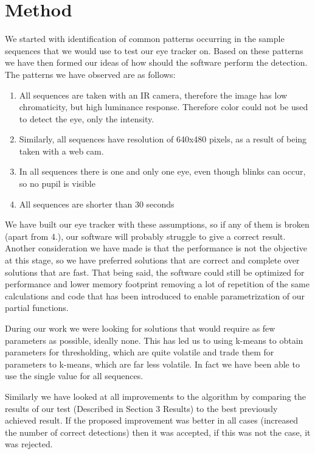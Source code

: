 \section{Method}

We started with identification of common patterns occurring in the sample sequences that we would use to test our eye tracker on. Based on these patterns we have then formed our ideas of how should the software perform the detection. The patterns we have observed are as follows:

\begin{enumerate}

\item All sequences are taken with an IR camera, therefore the image has low chromaticity, but high luminance response. Therefore color could not be used to detect the eye, only the intensity.
\item Similarly, all sequences have resolution of 640x480 pixels, as a result of being taken with a web cam.
\item In all sequences there is one and only one eye, even though blinks can occur, so no pupil is visible
\item All sequences are shorter than 30 seconds

\end{enumerate}

We have built our eye tracker with these assumptions, so if any of them is broken (apart from 4.), our software will probably struggle to give a correct result. Another consideration we have made is that the performance is not the objective at this stage, so we have preferred solutions that are correct and complete over solutions that are fast. That being said, the software could still be optimized for performance and lower memory footprint removing a lot of repetition of the same calculations and code that has been introduced to enable parametrization of our partial functions.

During our work we were looking for solutions that would require as few parameters as possible, ideally none. This has led us to using k-means to obtain parameters for thresholding, which are quite volatile and trade them for parameters to k-means, which are far less volatile. In fact we have been able to use the single value for all sequences.

Similarly we have looked at all improvements to the algorithm by comparing the results of our test (Described in Section 3 Results) to the best previously achieved result. If the proposed improvement was better in all cases (increased the number of correct detections) then it was accepted, if this was not the case, it was rejected.

